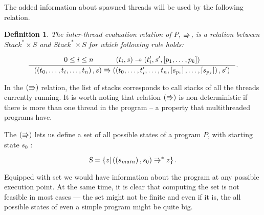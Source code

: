 \documentclass[..thesis.tex]{subfiles}
\newtheorem{defin}{Definition}[section]
\begin{document}

The added information about spawned threads will be used by the following relation.

\begin{defin}

  The inter-thread evaluation relation of $P$, $\Rrightarrow$,
  is a relation between $Stack^\ast \times S$ and  $Stack^\ast \times S$  for which following rule holds:   

  \begin{equation*}
    \inference{ 0 \leq i \leq n  \separ \lp t_i , s \rp \intrathread \lp t'_i, s', \lbk p_1, \ldots, p_k \rbk \rp}{ \lp \lp t_0, \ldots,t_i, \ldots, t_n \rp, s \rp \interthread  \lp \lp t_0, \ldots,t'_i, \ldots, t_n, \lbk s_{p_1} \rbk, \ldots, \lbk s_{p_k} \rbk  \rp , s' \rp} \text{.}
  \end{equation*}

\end{defin}

In the $\left( \Rrightarrow \right)$ relation, the list of stacks corresponds to call stacks of all the threads currently running.
It is worth noting that relation $\left( \Rrightarrow \right)$ is non-deterministic if there is more than one thread in the program -- a property that multithreaded programs have.

The $\left( \Rrightarrow \right)$ lets us define a set of all possible states of a program $P$, with starting state $s_0$ :

\begin{equation*}
\textsl{S} = \left\lbrace  z | \left( \left( s_{main} \right), s_0 \right) \Rrightarrow^{\ast} z \right\rbrace \text{.}
\end{equation*}



Equipped with set \allstates we would have information about the program at any possible execution point. At the same time,
 it is clear that computing the set \allstates is not feasible in most cases --- the set might not be finite and even if it is,
 the all possible states of even a simple program might be quite big.
\end{document}
